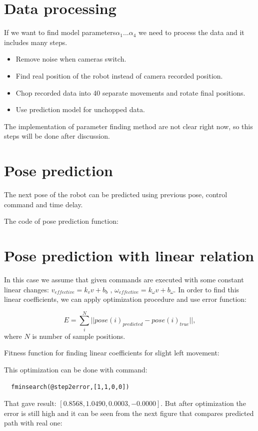 \documentclass[a4paper, 12pt]{article}
\begin{document}
\section{Data processing}
If we want to find model parameters$\alpha_1 ...\alpha_4$ we need to process the data and it includes many steps.

\begin{itemize}
\item Remove noise when cameras switch.
\item Find real position of the robot instead of camera recorded position.
\item Chop recorded data into 40 separate movements and rotate final positions.
\item Use prediction model for unchopped data.
\end{itemize}
The implementation of parameter finding method are not clear right now, so this steps will be done after discussion.




\section{Pose prediction}
The next pose of the robot can be predicted using previous pose, control command and time delay.

The code of pose prediction function:



\section{Pose prediction with linear relation}

In this case we assume that given commands are executed with some constant linear changes: $v_{effective} =k_v v+b_b $ , $\omega_{effective} =k_{\omega} v+b_{\omega} $. In order to find this linear coefficients, we can apply optimization procedure and use error function: 

\begin{equation}
E = \sum\limits_i^N ||pose(i)_{predicted} - pose(i)_{true}||,
\end{equation}
where $N$ is number of sample positions.

Fitness function for finding linear coefficients for slight left movement:




This optimization can be done with command:
\begin{lstlisting}
  fminsearch(@step2error,[1,1,0,0])
\end{lstlisting}
That gave result: $[0.8568,    1.0490,    0.0003,   -0.0000]$. But after optimization the error is still high and it can be seen from the next figure that compares predicted path with real one:
\end{document}
